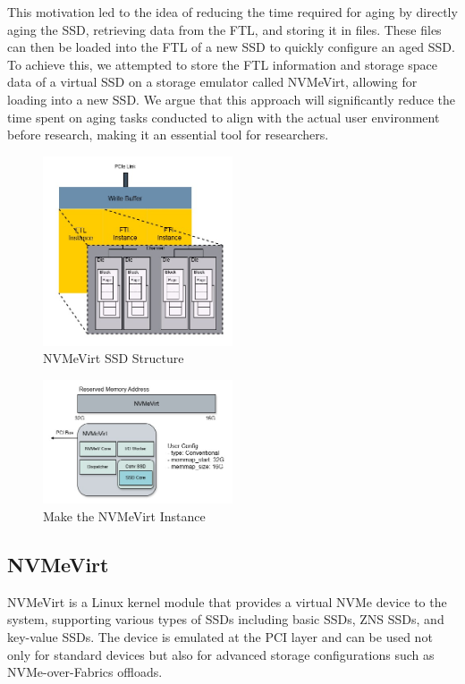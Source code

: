 This motivation led to the idea of reducing the time required for aging by directly aging the SSD, retrieving data from the FTL, and storing it in files.
These files can then be loaded into the FTL of a new SSD to quickly configure an aged SSD. 
To achieve this, we attempted to store the FTL information and storage space data of a virtual SSD on a storage emulator called NVMeVirt, allowing for loading into a new SSD.
We argue that this approach will significantly reduce the time spent on aging tasks conducted to align with the actual user environment before research, making it an essential tool for researchers.
\begin{figure}[!t]
    \centering
    \includegraphics[width=0.5\textwidth,keepaspectratio]{figs/SSD structure.jpg}
    \caption{NVMeVirt SSD Structure}
    \label{fig:structure}
\end{figure}
\begin{figure}[!t]
    \centering
    \includegraphics[width=0.5\textwidth,keepaspectratio]{figs/NVMeVirt making.jpg}
    \caption{Make the NVMeVirt Instance}
    \label{fig:making}
\end{figure}

\subsection{NVMeVirt}
NVMeVirt\cite{nvmevirt} is a Linux kernel module that provides a virtual NVMe device to the system, supporting various types of SSDs including basic SSDs, ZNS SSDs, and key-value SSDs. 
The device is emulated at the PCI layer and can be used not only for standard devices but also for advanced storage configurations such as NVMe-over-Fabrics offloads.

